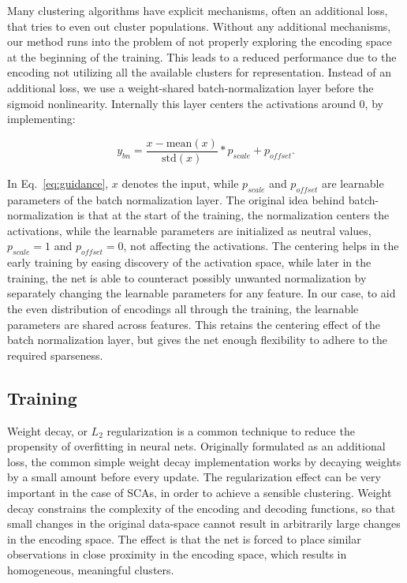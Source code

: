 			Many clustering algorithms have explicit mechanisms, often an additional loss, that tries to even out cluster populations.
			Without any additional mechanisms, our method runs into the problem of not properly exploring the encoding space at the beginning of the training.
			This leads to a reduced performance due to the encoding not utilizing all the available clusters for representation.
			Instead of an additional loss, we use a weight-shared batch-normalization layer before the sigmoid nonlinearity.
			Internally this layer centers the activations around $0$, by implementing:
			
			\begin{equation}
				\label{eq:guidance}
				y_{bn} = \frac{x - \mathrm{mean}(x)}{\mathrm{std}(x)}*p_{scale} + p_{offset}.	
			\end{equation}
			
			In Eq.~\ref{eq:guidance}, $x$ denotes the input, while $p_{scale}$ and $p_{offset}$ are learnable parameters of the batch normalization layer.
			The original idea behind batch-normalization is that at the start of the training, the normalization centers the activations, while the learnable parameters are initialized as neutral values, $p_{scale} = 1$ and $p_{offset} = 0$, not affecting the activations.
			The centering helps in the early training by easing discovery of the activation space, while later in the training, the net is able to counteract possibly unwanted normalization by separately changing the learnable parameters for any feature.
			In our case, to aid the even distribution of encodings all through the training, the learnable parameters are shared across features.
			This retains the centering effect of the batch normalization layer, but gives the net enough flexibility to adhere to the required sparseness.
			
		\subsection{Training}
			
			Weight decay, or $L_2$ regularization is a common technique to reduce the propensity of overfitting in neural nets.
			Originally formulated as an additional loss, the common simple weight decay implementation works by decaying weights by a small amount before every update.
			The regularization effect can be very important in the case of \acp{SCA}, in order to achieve a sensible clustering.
			Weight decay constrains the complexity of the encoding and decoding functions, so that small changes in the original data-space cannot result in arbitrarily large changes in the encoding space.
			The effect is that the net is forced to place similar observations in close proximity in the encoding space, which results in homogeneous, meaningful clusters.
			
